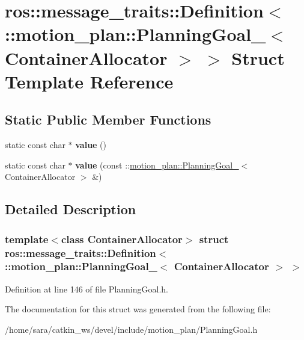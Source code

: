 \hypertarget{structros_1_1message__traits_1_1Definition_3_01_1_1motion__plan_1_1PlanningGoal___3_01ContainerAllocator_01_4_01_4}{}\section{ros\+:\+:message\+\_\+traits\+:\+:Definition$<$ \+:\+:motion\+\_\+plan\+:\+:Planning\+Goal\+\_\+$<$ Container\+Allocator $>$ $>$ Struct Template Reference}
\label{structros_1_1message__traits_1_1Definition_3_01_1_1motion__plan_1_1PlanningGoal___3_01ContainerAllocator_01_4_01_4}
\subsection*{Static Public Member Functions}
\begin{DoxyCompactItemize}
\item 
\mbox{\label{structros_1_1message__traits_1_1Definition_3_01_1_1motion__plan_1_1PlanningGoal___3_01ContainerAllocator_01_4_01_4_aa96c7ab90dfb1b62354bd7668085049a}} 
static const char $\ast$ {\bfseries value} ()
\item 
\mbox{\label{structros_1_1message__traits_1_1Definition_3_01_1_1motion__plan_1_1PlanningGoal___3_01ContainerAllocator_01_4_01_4_aa1270b9865cebbe112fda28da284a674}} 
static const char $\ast$ {\bfseries value} (const \+::\hyperlink{structmotion__plan_1_1PlanningGoal__}{motion\+\_\+plan\+::\+Planning\+Goal\+\_\+}$<$ Container\+Allocator $>$ \&)
\end{DoxyCompactItemize}


\subsection{Detailed Description}
\subsubsection*{template$<$class Container\+Allocator$>$\newline
struct ros\+::message\+\_\+traits\+::\+Definition$<$ \+::motion\+\_\+plan\+::\+Planning\+Goal\+\_\+$<$ Container\+Allocator $>$ $>$}



Definition at line 146 of file Planning\+Goal.\+h.



The documentation for this struct was generated from the following file\+:\begin{DoxyCompactItemize}
\item 
/home/sara/catkin\+\_\+ws/devel/include/motion\+\_\+plan/Planning\+Goal.\+h\end{DoxyCompactItemize}
